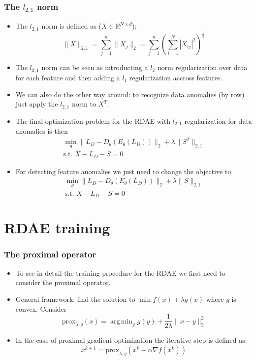 \documentclass{beamer}
\theoremstyle{plain}
\theoremstyle{definition}
\theoremstyle{remark}
\newcommand{\R}{\mathbb{R}}
\newcommand{\norm}[1]{\lVert#1\rVert}
\newcommand{\prox}{\text{prox}}
\DeclareMathOperator*{\argmin}{arg\,min}
\begin{document}
\begin{frame}
	\frametitle{The $l_{2,1}$ norm}
	\begin{itemize}
		\item The $l_{2,1}$ norm is defined as ($X\in \R^{N\times d}$):
			\begin{equation}
				\norm{X}_{2,1} = \sum_{j=1}^{n}{\norm{X_j}_{2}} = \sum_{j=1}^{n}{\left(\sum_{i=1}^{N}|X_{ij}|^{2}\right)^{\frac{1}{2}}}
			\end{equation}
		\item The $l_{2,1}$ norm can be seen as introducting a $l_2$ norm regularization over data for each feature and then adding a $l_1$ regularization accross features.
		\item We can also do the other way around: to recognize data anomalies (by row) just apply the $l_{2,1}$ norm to $X^T$.
	\end{itemize}
\end{frame}

\begin{frame}
	\begin{itemize}
		\item The final optimization problem for the RDAE with $l_{2,1}$ regularization for data anomalies is then
			\begin{align}
				\min_{\theta}{\norm{L_D -D_{\theta}(E_{\theta}(L_D))}_2 + \lambda\norm{S^T}_{2,1}}\\
				\text{s.t. }X-L_D-S=0  
			\end{align}
		\item For detecting feature anomalies we just need to change the objective to
			\begin{align}
				\min_{\theta}{\norm{L_D -D_{\theta}(E_{\theta}(L_D))}_2 + \lambda\norm{S}_{2,1}}\\
				\text{s.t. }X-L_D-S=0  
			\end{align}
	\end{itemize}
\end{frame}

\section{RDAE training}

\begin{frame}
	\frametitle{The proximal operator}
	\begin{itemize}
		\item To see in detail the training procedure for the RDAE we first need to consider the proximal operator.
		\item General framework: find the solution to $\min f(x)+\lambda g(x)$ where $g$ is convex. Consider
			\begin{equation}
				\prox_{\lambda, g}(x) = \argmin_{y}{g(y)+\frac{1}{2\lambda}\norm{x-y}_{2}^{2}}
			\end{equation}
		\item In the case of proximal gradient optimization the iterative step is defined as:
			\begin{equation}
				x^{k+1} = \prox_{\lambda, g}(x^{k}-\alpha \nabla f(x^{k}))
			\end{equation}
	\end{itemize}
\end{frame}
\end{document}
